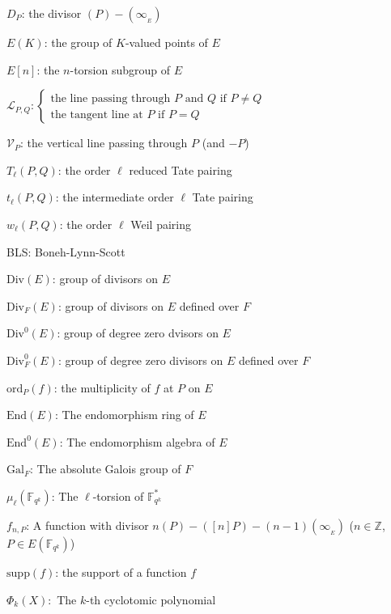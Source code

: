 \documentclass[a4paper, 11pt]{scrreprt}
\numberwithin{equation}{section}
\newcommand{\bz}{\mathbb Z}
\newcommand{\bFqk}{\mathbb{F}_{q^k}}
\newcommand{\absf}{\mathrm{Gal}_F}
\newcommand{\mc}{\mathcal}
\newcommand{\mr}{\mathrm}
\newcommand{\noin}{\noindent}
\theoremstyle{plain}
\begin{document}
\noin $D_P$: the divisor $(P)-(\infty_{_E})$ \vspace{2mm}

\noin $E(K)$: the group of $K$-valued points of $E$ \vspace{2mm}

\noin $E[n]$: the $n$-torsion subgroup of $E$ \vspace{2mm}

\noin $\mc{L}_{P,Q}: \begin{cases} \text{the line passing through } P \text{ and } Q \text{ if } P\neq Q\\ \text{the tangent line at } P \text{ if } P = Q \end{cases}$\vspace{2mm}

\noin $\mc{V}_{P}$: the vertical line passing through $P$ (and $-P$) \vspace{2mm}

\noin $T_{\ell}(P,Q)$: the order $\ell$ reduced Tate pairing \vspace{2mm}

\noin $t_{\ell}(P,Q)$: the intermediate order $\ell$ Tate pairing \vspace{2mm}

\noin $w_{\ell}(P,Q)$: the order $\ell$ Weil pairing  \vspace{2mm}

\noin BLS: Boneh-Lynn-Scott \vspace{2mm}

\noin $\mr{Div}(E)$: group of divisors on $E$ \vspace{2mm}

\noin $\mr{Div}_F(E)$: group of divisors on $E$ defined over $F$ \vspace{2mm}

\noin $\mr{Div}^0(E)$: group of degree zero dvisors on $E$ \vspace{2mm}

\noin $\mr{Div}^0_F(E)$: group of degree zero divisors on $E$ defined over $F$ \vspace{2mm}

\noin $\mr{ord}_P(f)$: the multiplicity of $f$ at $P$ on $E$ \vspace{2mm}

\noin $\mathrm{End}(E)$: The endomorphism ring of $E$  \vspace{2mm}

\noin $\mathrm{End}^0(E)$: The endomorphism algebra of $E$ \vspace{2mm}

\noin $\absf$: The absolute Galois group of $F$ \vspace{2mm}

\noin $\mu_{\ell}(\bFqk)$: The $\ell$-torsion of $\bFqk^*$ \vspace{2mm}

\noin $f_{n,P}$: A function with divisor $n(P)-([n]P)- (n-1)(\infty_{_E})$ \hspace{2mm} ($n\in \bz$, $P\in E(\bFqk)$) \vspace{2mm}

\noin $\mr{supp}(f)$: the support of a function $f$ \vspace{2mm}

\noin $\Phi_k(X):$ The $k$-th cyclotomic polynomial
\end{document}
